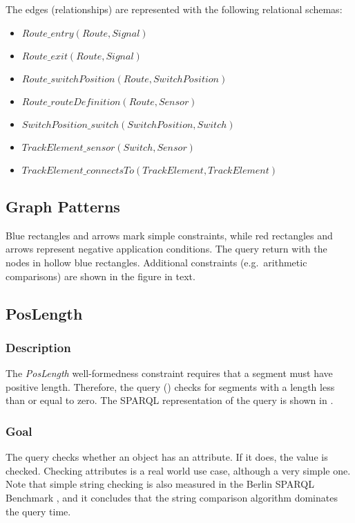 The edges (relationships) are represented with the following relational schemas:

\begin{itemize}
  \item $ \mathit{Route\_entry}\left(\mathit{Route}, \mathit{Signal}\right) $
  \item $ \mathit{Route\_exit}\left(\mathit{Route}, \mathit{Signal}\right) $
  \item $ \mathit{Route\_switchPosition}\left(\mathit{Route}, \mathit{SwitchPosition}\right) $
  \item $ \mathit{Route\_routeDefinition}\left(\mathit{Route}, \mathit{Sensor}\right) $
  \item $ \mathit{SwitchPosition\_switch}\left(\mathit{SwitchPosition}, \mathit{Switch}\right) $
  \item $ \mathit{TrackElement\_sensor}\left(\mathit{Switch}, \mathit{Sensor}\right) $
  \item $ \mathit{TrackElement\_connectsTo}\left(\mathit{TrackElement}, \mathit{TrackElement}\right) $
\end{itemize}

\subsection{Graph Patterns}

Blue rectangles and arrows mark simple constraints, while red rectangles and arrows represent negative application conditions. The query return with the nodes in hollow blue rectangles. Additional constraints (e.g.\ arithmetic comparisons) are shown in the figure in text.

\subsection{PosLength}

\subsubsection{Description} The \textit{PosLength} well-formedness constraint requires that a segment must have positive length. Therefore, the query () checks for segments with a length less than or equal to zero. The SPARQL representation of the query is shown in .

\subsubsection{Goal} The query checks whether an object has an attribute. If it does, the value is checked. Checking attributes is a real world use case, although a very simple one. Note that simple string checking is also measured in the Berlin SPARQL Benchmark \cite{BSBM}, and it concludes that the string comparison algorithm dominates the query time.

